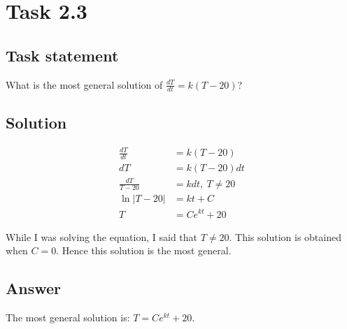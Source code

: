 \section*{Task 2.3}

\subsection*{Task statement}
What is the most general solution of $\frac{dT}{dt} = k(T - 20)$?

\subsection*{Solution}

\begin{displaymath}
    \begin{aligned}
        \frac{dT}{dt} & = k(T - 20) \\
        dT & = k(T - 20)dt \\
        \frac{dT}{T - 20} & = kdt,\ T \neq 20 \\
        \ln{|T - 20|} & = kt + C \\
        T & = C e^{kt} + 20
    \end{aligned}
\end{displaymath}

While I was solving the equation, I said that $T \neq 20$. This solution is obtained when $C = 0$. Hence this solution is the most general.

\subsection*{Answer}

The most general solution is: $T = C e^{kt} + 20$.